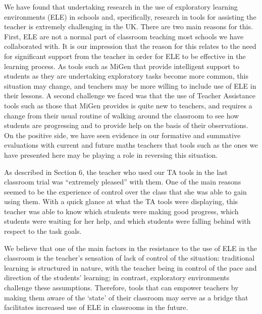 We have found that undertaking research in the use of exploratory
learning environments (ELE) in schools and, specifically, research in
tools for assisting the teacher is extremely challenging in the
UK. There are two main reasons for this. First, ELE are not a normal
part of classroom teaching most schools we have collaborated with. It
is our impression that the reason for this relates to the need for
significant support from the teacher in order for ELE to be effective
in the learning process. As tools such as MiGen that provide
intelligent support to students as they are undertaking exploratory
tasks become more common, this situation may change, and teachers may
be more willing to include use of ELE in their lessons. A second
challenge we faced was that the use of Teacher Assistance tools such
as those that MiGen provides is quite new to teachers, and requires a
change from their usual routine of walking around the classroom to see
how students are progressing and to provide help on the basis of their
observations. On the positive side, we have seen evidence in our
formative and summative evaluations with current and future maths
teachers that tools such as the ones we have presented here may be
playing a role in reversing this situation.
 
As described in Section 6, the teacher who used our TA tools in the
last classroom trial was “extremely pleased” with them. One of the
main reasons seemed to be the experience of control over the class
that she was able to gain using them. With a quick glance at what the
TA tools were displaying, this teacher was able to know which students
were making good progress, which students were waiting for her help,
and which students were falling behind with respect to the task goals.
 
We believe that one of the main factors in the resistance to the use
of ELE in the classroom is the teacher’s sensation of lack of control
of the situation: traditional learning is structured in nature, with
the teacher being in control of the pace and direction of the
students’ learning; in contrast, exploratory environments challenge
these assumptions. Therefore, tools that can empower teachers by
making them aware of the `state’ of their classroom may serve as a
bridge that facilitates increased use of ELE in classrooms in the
future.
 
